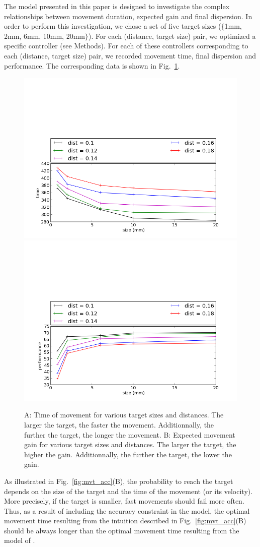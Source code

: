\documentclass[10pt]{article}
\begin{document}
The model presented in this paper is designed to investigate the complex relationships between movement duration, expected gain and final dispersion. In order to perform this investigation, we chose a set of five target sizes ($\{$1mm, 2mm, 6mm, 10mm, 20mm$\}$).
For each (distance, target size) pair, we optimized a specific controller (see Methods). For each of these controllers corresponding to each (distance, target size) pair, we recorded movement time, final dispersion and performance.
The corresponding data is shown in Fig.~\ref{fig:fitts_time}.

\begin{figure}[htp]
  \centering
\includegraphics[width=.5\columnwidth]{images/temps_fitts}
\includegraphics[width=.5\columnwidth]{images/cout_fitts}
  \caption{A: Time of movement for various target sizes and distances. The larger the target, the faster the movement. Additionnally, the further the target, the longer the movement.
B: Expected movement gain for various target sizes and distances. The larger the target, the higher the gain. Additionnally, the further the target, the lower the gain.
\label{fig:fitts_time}}
\end{figure}

As illustrated in Fig.~\ref{fig:mvt_acc}(B), the probability to reach the target depends on the size of the target and the time of the movement (or its velocity). More precisely, if the target is smaller, fast movements should fail more often. Thus, as a result of including the accuracy constraint in the model, the optimal movement time resulting from the intuition described in Fig.~\ref{fig:mvt_acc}(B) should be always longer than the optimal movement time resulting from the model of \cite{rigoux12}.
\end{document}
